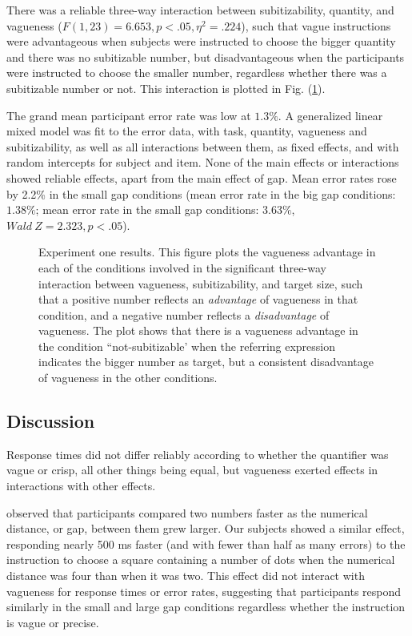 \documentclass[man,floatmark]{apa}
\begin{document}
There was a reliable three-way interaction between subitizability, quantity, and vagueness ($F(1,23)=6.653,p<.05,\eta^2=.224$), such that vague instructions were advantageous when subjects were instructed to choose the bigger quantity and there was no subitizable number, but disadvantageous when the participants were instructed to choose the smaller number, regardless whether there was a subitizable number or not. This interaction is plotted in Fig. (\ref{resultse1}).

The grand mean participant error rate was low at $1.3\%$. A generalized linear mixed model \cite{jaeger2008categorical} was fit to the error data, with task, quantity, vagueness and subitizability, as well as all interactions between them, as fixed effects, and with random intercepts for subject and item. None of the main effects or interactions showed reliable effects, apart from the main effect of gap. Mean error rates rose by 2.2\% in the small gap conditions (mean error rate in the big gap conditions: $1.38\%$; mean error rate in the small gap conditions: $3.63\%$, $Wald~Z = 2.323, p<.05 $).

\begin{figure}[tbp]
\caption{Experiment one results. This figure plots the vagueness advantage in each of the conditions involved in the significant three-way interaction between vagueness, subitizability, and target size, such that a positive number reflects an \emph{advantage} of vagueness in that condition, and a negative number reflects a \emph{disadvantage} of vagueness. The plot shows that there is a vagueness advantage in the  condition ``not-subitizable'  when the referring expression indicates the bigger number as target, but a consistent disadvantage of vagueness in the other conditions.}
\label{resultse1}
\end{figure}

\subsection{Discussion}
Response times did not differ reliably according to whether the quantifier was vague or crisp, all other things being equal, but vagueness exerted effects in interactions with other effects.

 observed that participants compared two numbers faster as the numerical distance, or gap, between them grew larger. Our subjects showed a similar effect, responding nearly 500 ms faster (and with fewer than half as many errors) to the instruction to choose a square containing a number of dots when the numerical distance was four than when it was two. This effect did not interact with vagueness for response times or error rates, suggesting that  participants respond similarly in the small and large gap conditions regardless whether the instruction is vague or precise.
\end{document}
